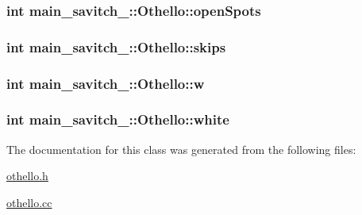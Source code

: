 \subsubsection[{\texorpdfstring{open\+Spots}{openSpots}}]{\setlength{\rightskip}{0pt plus 5cm}int main\+\_\+savitch\+\_\+::\+Othello\+::open\+Spots\hspace{0.3cm}{\ttfamily [protected]}}\hypertarget{classmain__savitch__14_1_1_othello_a15045e3e94c34afe08240885e230d502}{}\label{classmain__savitch__14_1_1_othello_a15045e3e94c34afe08240885e230d502}
\subsubsection[{\texorpdfstring{skips}{skips}}]{\setlength{\rightskip}{0pt plus 5cm}int main\+\_\+savitch\+\_\+::\+Othello\+::skips\hspace{0.3cm}{\ttfamily [protected]}}\hypertarget{classmain__savitch__14_1_1_othello_a85d4ce17512d8dbf85a313a27eea0644}{}\label{classmain__savitch__14_1_1_othello_a85d4ce17512d8dbf85a313a27eea0644}
\subsubsection[{\texorpdfstring{w}{w}}]{\setlength{\rightskip}{0pt plus 5cm}int main\+\_\+savitch\+\_\+::\+Othello\+::w\hspace{0.3cm}{\ttfamily [protected]}}\hypertarget{classmain__savitch__14_1_1_othello_a1b11c5fe33e30a94ed39e8cb55caf37e}{}\label{classmain__savitch__14_1_1_othello_a1b11c5fe33e30a94ed39e8cb55caf37e}
\subsubsection[{\texorpdfstring{white}{white}}]{\setlength{\rightskip}{0pt plus 5cm}int main\+\_\+savitch\+\_\+::\+Othello\+::white\hspace{0.3cm}{\ttfamily [protected]}}\hypertarget{classmain__savitch__14_1_1_othello_a7d5f59b1e581ed7a8145debeecf4f310}{}\label{classmain__savitch__14_1_1_othello_a7d5f59b1e581ed7a8145debeecf4f310}


The documentation for this class was generated from the following files\+:\begin{DoxyCompactItemize}
\item 
\hyperlink{othello_8h}{othello.\+h}\item 
\hyperlink{othello_8cc}{othello.\+cc}\end{DoxyCompactItemize}

